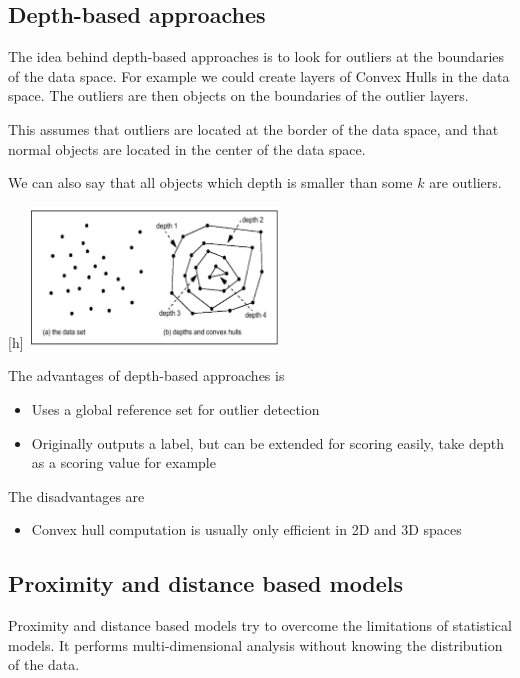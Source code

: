 \subsection{Depth-based approaches}
    The idea behind depth-based approaches is to look for outliers at the boundaries of the data space. For example we could create layers of Convex Hulls in the data space. The outliers are then objects on the boundaries of the outlier layers. 
    
    This assumes that outliers are located at the border of the data space, and that normal objects are located in the center of the data space. 
    
    We can also say that all objects which depth is smaller than some $k$ are outliers.
    
    \begin{center}[h]
        \includegraphics[width=0.5\textwidth]{images/layers.png}
    \end{center}
    
    The advantages of depth-based approaches is 
    \begin{itemize}
        \item Uses a global reference set for outlier detection
        \item Originally outputs a label, but can be extended for scoring easily, take depth as a scoring value for example
    \end{itemize}
    
    The disadvantages are
    \begin{itemize}
        \item Convex hull computation is usually only efficient in 2D and 3D spaces
    \end{itemize}
    
\subsection{Proximity and distance based models}
    Proximity and distance based models try to overcome the limitations of statistical models. It performs multi-dimensional analysis without knowing the distribution of the data.
    
